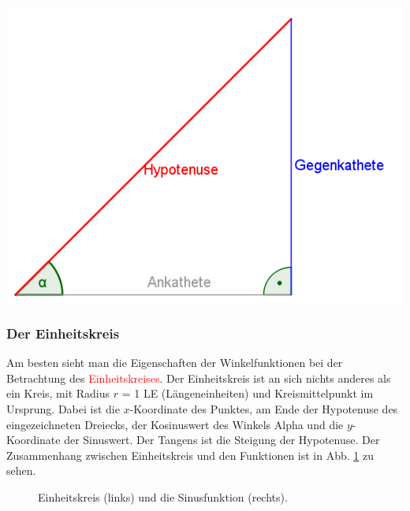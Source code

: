 \begin{minipage}{0.45\textwidth}
\includegraphics[width=1.0\textwidth]{pictures/TrigonDreieck}
\end{minipage}

\subsubsection{Der Einheitskreis}
Am besten sieht man die Eigenschaften der Winkelfunktionen bei der Betrachtung des \textcolor{red}{Einheitskreises}. Der Einheitskreis ist an sich nichts anderes als ein Kreis, mit Radius $r$ = 1 LE (Längeneinheiten) und Kreismittelpunkt im Ursprung. Dabei ist die $x$-Koordinate des Punktes, am Ende der Hypotenuse des eingezeichneten Dreiecks, der Kosinuswert des Winkels Alpha und die $y$-Koordinate der Sinuswert. Der Tangens ist die Steigung der Hypotenuse. Der Zusammenhang zwischen Einheitskreis und den Funktionen ist in Abb. \ref{fig:circ} zu sehen.

\begin{figure}[h!]

\caption{Einheitskreis (links) und die Sinusfunktion (rechts).}
\label{fig:circ}
\end{figure}

